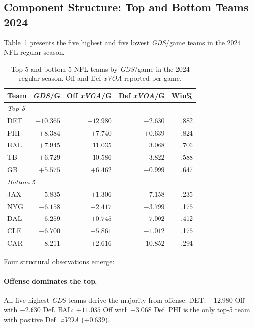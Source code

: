 \documentclass[12pt,a4paper]{article}
\newcommand{\xvoa}{\textit{xVOA}}
\newcommand{\gds}{\textit{GDS}}
\begin{document}
\subsection{Component Structure: Top and Bottom Teams 2024}

Table~\ref{tab:top-bottom} presents the five highest and five lowest \gds{}/game teams in the 2024 NFL regular season.

\begin{table}[htbp]
  \centering
  \caption{Top-5 and bottom-5 NFL teams by \gds{}/game in the 2024 regular season. Off and Def \xvoa{} reported per game.}
  \label{tab:top-bottom}
  \begin{tabular}{lrrrr}
    \toprule
    \textbf{Team} & \textbf{\gds{}/G} & \textbf{Off \xvoa{}/G} & \textbf{Def \xvoa{}/G} & \textbf{Win\%} \\
    \midrule
    \multicolumn{5}{l}{\textit{Top 5}} \\[2pt]
    DET & $+10.365$ & $+12.980$ & $-2.630$ & .882 \\
    PHI & $+8.384$  & $+7.740$  & $+0.639$ & .824 \\
    BAL & $+7.945$  & $+11.035$ & $-3.068$ & .706 \\
    TB  & $+6.729$  & $+10.586$ & $-3.822$ & .588 \\
    GB  & $+5.575$  & $+6.462$  & $-0.999$ & .647 \\[6pt]
    \multicolumn{5}{l}{\textit{Bottom 5}} \\[2pt]
    JAX & $-5.835$  & $+1.306$  & $-7.158$  & .235 \\
    NYG & $-6.158$  & $-2.417$  & $-3.799$  & .176 \\
    DAL & $-6.259$  & $+0.745$  & $-7.002$  & .412 \\
    CLE & $-6.700$  & $-5.861$  & $-1.012$  & .176 \\
    CAR & $-8.211$  & $+2.616$  & $-10.852$ & .294 \\
    \bottomrule
  \end{tabular}
\end{table}

Four structural observations emerge:

\paragraph{Offense dominates the top.} All five highest-\gds{} teams derive the majority from offense. DET: $+12.980$ Off with $-2.630$ Def. BAL: $+11.035$ Off with $-3.068$ Def. PHI is the only top-5 team with positive Def\_\xvoa{} ($+0.639$).
\end{document}
